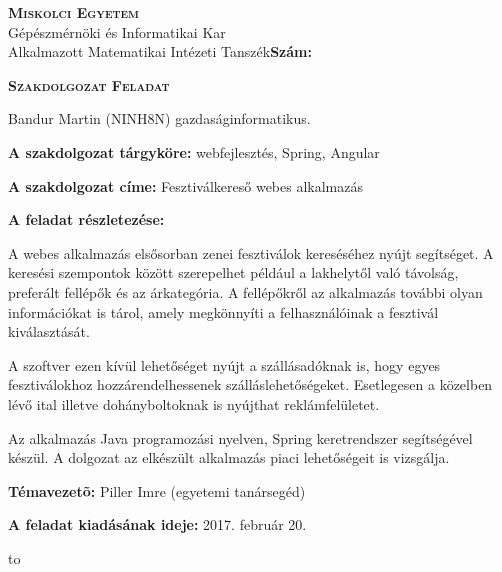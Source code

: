 \begin{flushleft}
\textsc{\bfseries Miskolci Egyetem}\\
Gépészmérnöki és Informatikai Kar\\
Alkalmazott Matematikai Intézeti Tanszék\hspace*{4cm}\hfil \textbf{Szám:}
\end{flushleft}
\vskip 0.5cm
\begin{center}
\large\textsc{\bfseries Szakdolgozat Feladat}
\end{center}
\vskip 0.5cm
Bandur Martin (NINH8N) gazdaságinformatikus.\newline

\noindent\textbf{A szakdolgozat tárgyköre:} webfejlesztés, Spring, Angular\newline

\noindent\textbf{A szakdolgozat címe:} Fesztiválkereső webes alkalmazás \newline

\noindent\textbf{A feladat részletezése:}

\bigskip

A webes alkalmazás elsősorban zenei fesztiválok kereséséhez nyújt segítséget. A keresési szempontok között szerepelhet például a lakhelytől való távolság, preferált fellépők és az árkategória. A fellépőkről az alkalmazás további olyan információkat is tárol, amely megkönnyíti a felhasználóinak a fesztivál kiválasztását.

\medskip

A szoftver ezen kívül lehetőséget nyújt a szállásadóknak is, hogy egyes fesztiválokhoz hozzárendelhessenek szálláslehetőségeket. Esetlegesen a közelben lévő ital illetve dohányboltoknak is nyújthat reklámfelületet.

\medskip

Az alkalmazás Java programozási nyelven, Spring keretrendszer segítségével készül. A dolgozat az elkészült alkalmazás piaci lehetőségeit is vizsgálja.

\vfill

\noindent\textbf{Témavezetõ:} Piller Imre (egyetemi tanársegéd) \newline

\noindent\textbf{A feladat kiadásának ideje:}
2017. február 20.
\newline


\vskip 2cm

\hbox to 

